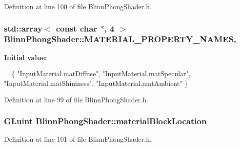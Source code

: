 Definition at line 100 of file Blinn\+Phong\+Shader.\+h.

\hypertarget{class_blinn_phong_shader_a6bb55aa4f7aa8b54b127b93386e36dc2}{}
\subsubsection[{M\+A\+T\+E\+R\+I\+A\+L\+\_\+\+P\+R\+O\+P\+E\+R\+T\+Y\+\_\+\+N\+A\+M\+E\+S}]{\setlength{\rightskip}{0pt plus 5cm}std\+::array$<$ const char $\ast$, 4 $>$ Blinn\+Phong\+Shader\+::\+M\+A\+T\+E\+R\+I\+A\+L\+\_\+\+P\+R\+O\+P\+E\+R\+T\+Y\+\_\+\+N\+A\+M\+E\+S\hspace{0.3cm}{\ttfamily [static]}, {\ttfamily [protected]}}\label{class_blinn_phong_shader_a6bb55aa4f7aa8b54b127b93386e36dc2}
{\bfseries Initial value\+:}
\begin{DoxyCode}
= \{
    \textcolor{stringliteral}{"InputMaterial.matDiffuse"}, 
    \textcolor{stringliteral}{"InputMaterial.matSpecular"}, 
    \textcolor{stringliteral}{"InputMaterial.matShininess"}, 
    \textcolor{stringliteral}{"InputMaterial.matAmbient"}
\}
\end{DoxyCode}


Definition at line 99 of file Blinn\+Phong\+Shader.\+h.

\hypertarget{class_blinn_phong_shader_a4dcd123c2284945734df697501dca5ea}{}
\subsubsection[{material\+Block\+Location}]{\setlength{\rightskip}{0pt plus 5cm}G\+Luint Blinn\+Phong\+Shader\+::material\+Block\+Location\hspace{0.3cm}{\ttfamily [protected]}}\label{class_blinn_phong_shader_a4dcd123c2284945734df697501dca5ea}


Definition at line 101 of file Blinn\+Phong\+Shader.\+h.

\hypertarget{class_blinn_phong_shader_af38b3d042773f6568f0f6c227de85990}{}
